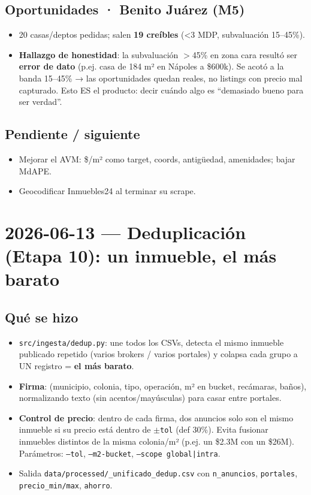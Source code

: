 \documentclass[11pt]{article}
\newcommand{\codigo}[1]{\texttt{#1}}
\newcommand{\pend}{\item[\textcolor{acento}{$\square$}]}
\begin{document}
\subsection*{Oportunidades · Benito Juárez (M5)}
\begin{itemize}
  \item 20 casas/deptos pedidas; salen \textbf{19 creíbles} (<3 MDP, subvaluación
        15–45\%).
  \item \textbf{Hallazgo de honestidad}: la subvaluación $>$45\% en zona cara
        resultó ser \textbf{error de dato} (p.ej. casa de 184 m² en Nápoles a
        \$600k). Se acotó a la banda 15–45\% → las oportunidades quedan reales,
        no listings con precio mal capturado. Esto ES el producto: decir cuándo
        algo es ``demasiado bueno para ser verdad''.
\end{itemize}

\subsection*{Pendiente / siguiente}
\begin{itemize}
  \pend Mejorar el AVM: \$/m² como target, coords, antigüedad, amenidades; bajar MdAPE.
  \pend Geocodificar Inmuebles24 al terminar su scrape.
\end{itemize}

\section*{2026-06-13 — Deduplicación (Etapa 10): un inmueble, el más barato}

\subsection*{Qué se hizo}
\begin{itemize}
  \item \codigo{src/ingesta/dedup.py}: une todos los CSVs, detecta el mismo
        inmueble publicado repetido (varios brokers / varios portales) y colapsa
        cada grupo a UN registro = \textbf{el más barato}.
  \item \textbf{Firma}: (municipio, colonia, tipo, operación, m² en bucket,
        recámaras, baños), normalizando texto (sin acentos/mayúsculas) para casar
        entre portales.
  \item \textbf{Control de precio}: dentro de cada firma, dos anuncios solo son el
        mismo inmueble si su precio está dentro de $\pm$\codigo{tol} (def 30\%).
        Evita fusionar inmuebles distintos de la misma colonia/m² (p.ej. un
        \$2.3M con un \$26M). Parámetros: \codigo{--tol}, \codigo{--m2-bucket},
        \codigo{--scope global|intra}.
  \item Salida \codigo{data/processed/\_unificado\_dedup.csv} con
        \codigo{n\_anuncios}, \codigo{portales}, \codigo{precio\_min/max},
        \codigo{ahorro}.
\end{itemize}
\end{document}
